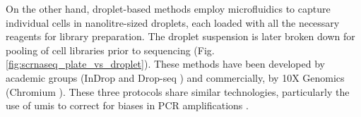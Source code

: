 On the other hand, droplet-based methods employ microfluidics to capture individual cells in nanolitre-sized droplets, each loaded with all the necessary reagents for library preparation.
The droplet suspension is later broken down for pooling of cell libraries prior to sequencing (Fig. \ref{fig:scrnaseq_plate_vs_droplet}). 
These methods have been developed by academic groups (InDrop \cite{klein2015droplet} and Drop-seq \cite{macosko2015highly}) and commercially, by 10X Genomics (Chromium \cite{zheng2017massively}). 
These three protocols share similar technologies, particularly the use of \glspl{umi} to correct for biases in PCR amplifications \cite{kivioja2012counting}. 
\\

